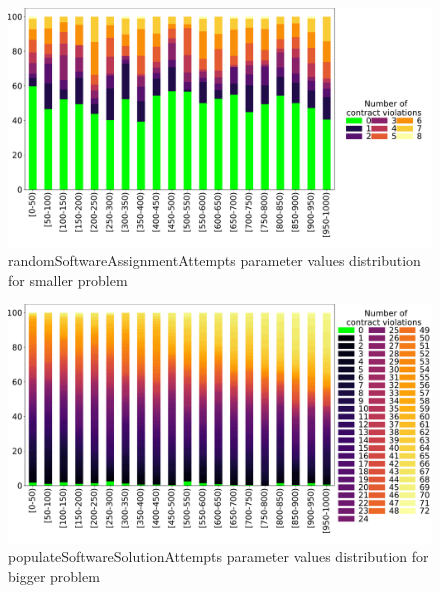 \begin{figure}
	\centering
	\includegraphics[width=\textwidth]{images/DistrValiditySmall/randomSoftwareAssignmentAttempts.pdf}
	\caption[randomSoftwareAssignmentAttempts parameter values distribution for smaller problem]{randomSoftwareAssignmentAttempts parameter values distribution for smaller problem}
	\label{fig:randomSoftwareAssignmentAttempts_DistSmall}
\end{figure}
\begin{figure}
	\centering
	\includegraphics[width=\textwidth]{images/DistrValidityBig/populateSoftwareSolutionAttempts.pdf}
	\caption[populateSoftwareSolutionAttempts parameter values distribution for bigger problem]{populateSoftwareSolutionAttempts parameter values distribution for bigger problem}
	\label{fig:populateSoftwareSolutionAttempts_DistBig}
\end{figure}
